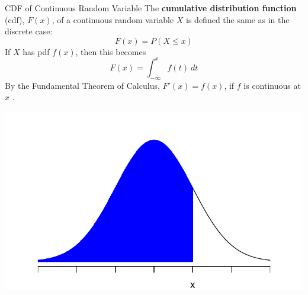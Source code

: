 \documentclass[handout]{beamer}
\renewcommand{\emph}{\textbf}
\begin{document}
\begin{frame}{CDF of Continuous Random Variable}
The \emph{cumulative distribution function} (cdf), $F(x)$, of a continuous random variable $X$ is defined the same as in the discrete case:
$$F(x) = P(X \leq x)$$
\pause If $X$ has pdf $f(x)$, then this becomes
$$F(x) = \int_{-\infty}^x f(t)\ dt$$
\pause By the Fundamental Theorem of Calculus, $F'(x)=f(x)$, if $f$ is continuous at $x$ .
\vspace{-.5cm}
\begin{center}
\includegraphics[scale=.5]{ch4_cdf_norm.pdf}
\end{center}
\end{frame}
\end{document}
